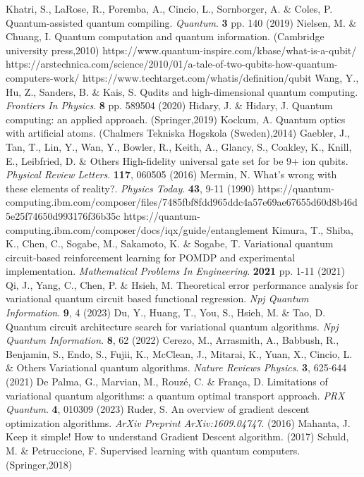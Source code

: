\documentclass[inscr,ack,preface]{diphdthesis}
\begin{document}


\printglossary





\begin{thebibliography}{99}                                                   
Khatri, S., LaRose, R., Poremba, A., Cincio, L., Sornborger, A. \& Coles, P. Quantum-assisted quantum compiling. {\em Quantum}. \textbf{3} pp. 140 (2019)
Nielsen, M. \& Chuang, I. Quantum computation and quantum information. (Cambridge university press,2010)
https://www.quantum-inspire.com/kbase/what-is-a-qubit/
https://arstechnica.com/science/2010/01/a-tale-of-two-qubits-how-quantum-computers-work/
https://www.techtarget.com/whatis/definition/qubit
Wang, Y., Hu, Z., Sanders, B. \& Kais, S. Qudits and high-dimensional quantum computing. {\em Frontiers In Physics}. \textbf{8} pp. 589504 (2020)
Hidary, J. \& Hidary, J. Quantum computing: an applied approach. (Springer,2019)
Kockum, A. Quantum optics with artificial atoms. (Chalmers Tekniska Hogskola (Sweden),2014)
Gaebler, J., Tan, T., Lin, Y., Wan, Y., Bowler, R., Keith, A., Glancy, S., Coakley, K., Knill, E., Leibfried, D. \& Others High-fidelity universal gate set for be 9+ ion qubits. {\em Physical Review Letters}. \textbf{117}, 060505 (2016)
Mermin, N. What's wrong with these elements of reality?. {\em Physics Today}. \textbf{43}, 9-11 (1990)
https://quantum-computing.ibm.com/composer/files/7485fbf8fdd965ddc4a57e69ae67655d60d8b46d5e25f74650d993176f36b35c
https://quantum-computing.ibm.com/composer/docs/iqx/guide/entanglement
Kimura, T., Shiba, K., Chen, C., Sogabe, M., Sakamoto, K. \& Sogabe, T. Variational quantum circuit-based reinforcement learning for POMDP and experimental implementation. {\em Mathematical Problems In Engineering}. \textbf{2021} pp. 1-11 (2021)
Qi, J., Yang, C., Chen, P. \& Hsieh, M. Theoretical error performance analysis for variational quantum circuit based functional regression. {\em Npj Quantum Information}. \textbf{9}, 4 (2023)
Du, Y., Huang, T., You, S., Hsieh, M. \& Tao, D. Quantum circuit architecture search for variational quantum algorithms. {\em Npj Quantum Information}. \textbf{8}, 62 (2022)
Cerezo, M., Arrasmith, A., Babbush, R., Benjamin, S., Endo, S., Fujii, K., McClean, J., Mitarai, K., Yuan, X., Cincio, L. \& Others Variational quantum algorithms. {\em Nature Reviews Physics}. \textbf{3}, 625-644 (2021)
De Palma, G., Marvian, M., Rouzé, C. \& França, D. Limitations of variational quantum algorithms: a quantum optimal transport approach. {\em PRX Quantum}. \textbf{4}, 010309 (2023)
Ruder, S. An overview of gradient descent optimization algorithms. {\em ArXiv Preprint ArXiv:1609.04747}. (2016)
Mahanta, J. Keep it simple! How to understand Gradient Descent algorithm.  (2017)
Schuld, M. \& Petruccione, F. Supervised learning with quantum computers. (Springer,2018)


\end{thebibliography}
\end{document}
